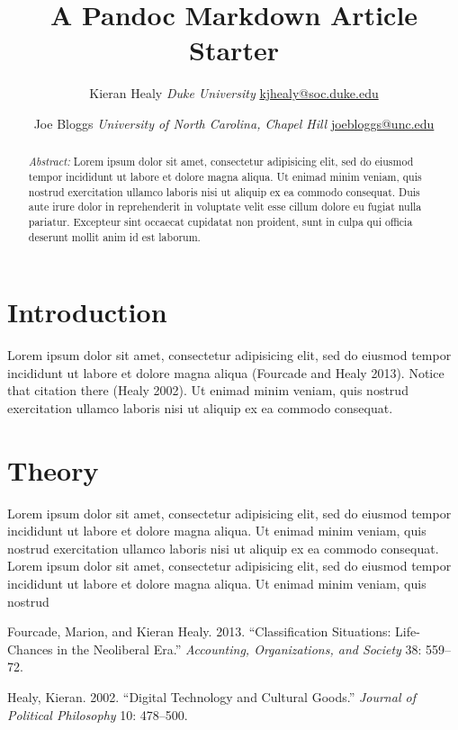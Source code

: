 \documentclass[11pt,article,oneside]{memoir}
\title{\bigskip \bigskip A Pandoc Markdown Article Starter }
\author{\Large Kieran Healy\vspace{0.05in} 
\newline\normalsize
\emph{Duke University} 
\newline\footnotesize 
\url{kjhealy@soc.duke.edu}\vspace*{0.2in}
\newline  \and \Large Joe Bloggs\vspace{0.05in} 
\newline\normalsize\emph{University of North Carolina, Chapel Hill} 
\newline\footnotesize \url{joebloggs@unc.edu}\vspace*{0.2in}\newline }
\date{}
\begin{document}
  
\pagestyle{kjh}


\maketitle



\begin{abstract}

\noindent \emph{Abstract:} Lorem ipsum dolor sit amet, consectetur adipisicing elit, sed do eiusmod
tempor incididunt ut labore et dolore magna aliqua. Ut enimad minim
veniam, quis nostrud exercitation ullamco laboris nisi ut aliquip ex ea
commodo consequat. Duis aute irure dolor in reprehenderit in voluptate
velit esse cillum dolore eu fugiat nulla pariatur. Excepteur sint
occaecat cupidatat non proident, sunt in culpa qui officia deserunt
mollit anim id est laborum.

\end{abstract}


\chapter{Introduction}\label{introduction}

Lorem ipsum dolor sit amet, consectetur adipisicing elit, sed do eiusmod
tempor incididunt ut labore et dolore magna aliqua (Fourcade and Healy
2013). Notice that citation there (Healy 2002). Ut enimad minim veniam,
quis nostrud exercitation ullamco laboris nisi ut aliquip ex ea commodo
consequat.

\chapter{Theory}\label{theory}

Lorem ipsum dolor sit amet, consectetur adipisicing elit, sed do eiusmod
tempor incididunt ut labore et dolore magna aliqua. Ut enimad minim
veniam, quis nostrud exercitation ullamco laboris nisi ut aliquip ex ea
commodo consequat. Lorem ipsum dolor sit amet, consectetur adipisicing
elit, sed do eiusmod tempor incididunt ut labore et dolore magna aliqua.
Ut enimad minim veniam, quis nostrud

\hypertarget{refs}{}
\hypertarget{ref-fourcade13:ux5fclassux5fsituat}{}
Fourcade, Marion, and Kieran Healy. 2013. ``Classification Situations:
Life-Chances in the Neoliberal Era.'' \emph{Accounting, Organizations,
and Society} 38: 559--72.

\hypertarget{ref-healy02:ux5fdigitux5ftechnux5fculturux5fgoods}{}
Healy, Kieran. 2002. ``Digital Technology and Cultural Goods.''
\emph{Journal of Political Philosophy} 10: 478--500.
\end{document}
